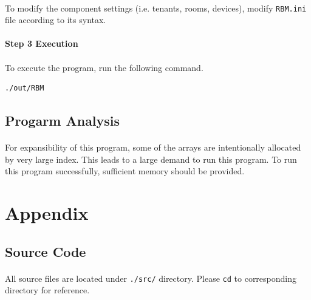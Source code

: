 \documentclass{article}
\begin{document}
            \paragraph{}
                To modify the component settings (i.e. tenants, rooms, devices),
                modify \texttt{RBM.ini} file according to its syntax.
            \paragraph{Step 3 Execution}
            \paragraph{}
                To execute the program, run the following command.
            \begin{Verbatim}[gobble=8]
                ./out/RBM
            \end{Verbatim}

        \subsection{Progarm Analysis}
            \paragraph{}
                For expansibility of this program, some of the arrays are intentionally allocated
                by very large index. This leads to a large demand to run this program. To run this
                program successfully, sufficient memory should be provided.
            
    \cleardoublepage
    \section{Appendix}
        \subsection{Source Code}
            \paragraph{}
                All source files are located under \texttt{./src/} directory. Please \texttt{cd}
                to corresponding directory for reference.
\end{document}
